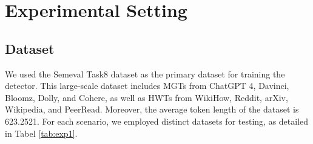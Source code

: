 \section{Experimental Setting}
\label{apdx:expset}

\subsection{Dataset}
\label{apdx:dataset}

We used the Semeval Task8 dataset \cite{siino2024badrock} as the primary dataset for training the detector.
This large-scale dataset includes MGTs from ChatGPT 4, Davinci, Bloomz, Dolly, and Cohere, as well as HWTs from WikiHow, Reddit, arXiv, Wikipedia, and PeerRead.
Moreover, the average token length of the dataset is 623.2521. For each scenario, we employed distinct datasets for testing, as detailed in Tabel \ref{tab:exp1}.


\begin{table}[h]
\centering
\renewcommand{\arraystretch}{1.8}
\caption{Experimental scenarios and corresponding datasets.}
\label{tab:exp1}
\end{table}

